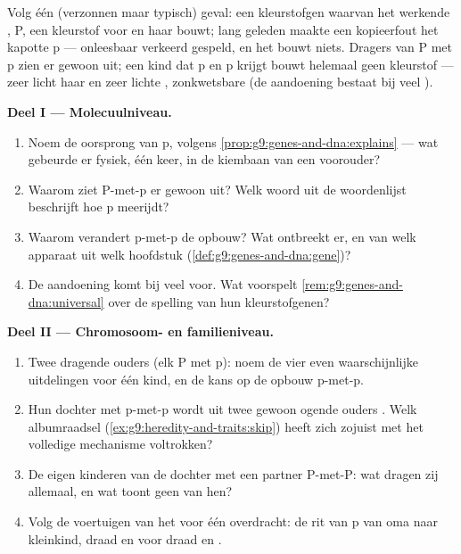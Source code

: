 \begin{problem}\label{pb:g9:genes-and-dna:1}
Volg één (verzonnen maar typisch) geval: een kleurstofgen
waarvan het werkende , P, een kleurstof voor  en haar
bouwt; lang geleden maakte een kopieerfout het kapotte  p
--- onleesbaar verkeerd gespeld, en het bouwt niets. Dragers van
P met p zien er gewoon uit; een kind dat p en p krijgt bouwt
helemaal geen kleurstof --- zeer licht haar en zeer lichte ,
zonkwetsbare  (de aandoening bestaat bij veel ).

\medskip\noindent\textbf{Deel I --- Molecuulniveau.}
\begin{enumerate}
  \item Noem de oorsprong van p, volgens
        \cref{prop:g9:genes-and-dna:explains} --- wat gebeurde
        er fysiek, één keer, in de kiembaan van een voorouder?
  \item Waarom ziet P-met-p er gewoon uit? Welk woord uit de
        woordenlijst beschrijft hoe p meerijdt?
  \item Waarom verandert p-met-p de opbouw? Wat ontbreekt er, en
        van welk  apparaat uit welk hoofdstuk
        (\cref{def:g9:genes-and-dna:gene})?
  \item De aandoening komt bij veel  voor. Wat voorspelt
        \cref{rem:g9:genes-and-dna:universal} over de spelling
        van hun kleurstofgenen?
\end{enumerate}

\medskip\noindent\textbf{Deel II --- Chromosoom- en
familieniveau.}
\begin{enumerate}[resume]
  \item Twee dragende ouders (elk P met p): noem de vier even
        waarschijnlijke uitdelingen voor één kind, en de kans op
        de opbouw p-met-p.
  \item Hun dochter met p-met-p wordt uit twee gewoon ogende
        ouders . Welk albumraadsel
        (\cref{ex:g9:heredity-and-traits:skip}) heeft zich zojuist
        met het volledige mechanisme voltrokken?
  \item De eigen kinderen van de dochter met een partner
        P-met-P: wat dragen zij allemaal, en wat toont geen van
        hen?
  \item Volg de voertuigen van het  voor één overdracht: de
        rit van p van oma naar kleinkind, draad en 
        voor draad en .
\end{enumerate}


\end{problem}

